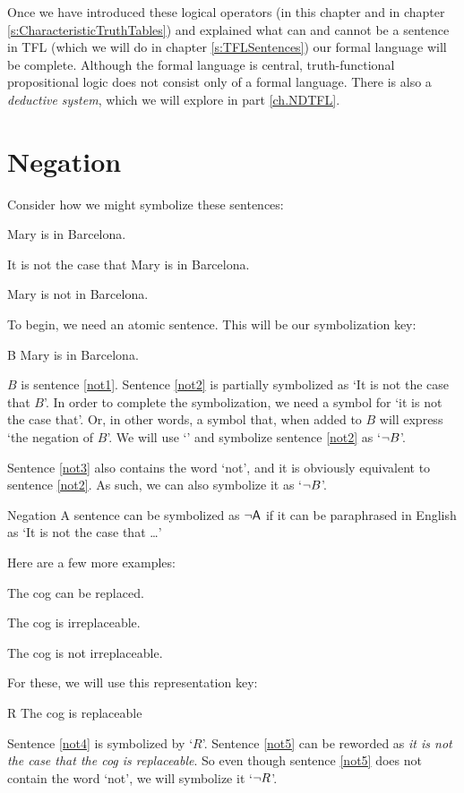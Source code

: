Once we have introduced these logical operators (in this chapter and in chapter \ref{s:CharacteristicTruthTables}) and explained what can and cannot be a sentence in TFL (which we will do in chapter \ref{s:TFLSentences}) our formal language will be complete. Although the formal language is central, truth-functional propositional logic does not consist only of a formal language. There is also a \textit{deductive system}, which we will explore in part \ref{ch.NDTFL}. 

        
\section{Negation}

Consider how we might symbolize these sentences:
	\begin{earg}
	\item[\ex{not1}] Mary is in Barcelona.
	\item[\ex{not2}] It is not the case that Mary is in Barcelona.
	\item[\ex{not3}] Mary is not in Barcelona.
	\end{earg}
To begin, we need an atomic sentence. This will be our symbolization key:
	\begin{ekey}
		\item[B] Mary is in Barcelona.
	\end{ekey}
$B$ is sentence \ref{not1}. Sentence \ref{not2} is partially symbolized as `It is not the case that $B$'. In order to complete the symbolization, we need a symbol for `it is not the case that'. Or, in other words, a symbol that, when added to $B$ will express `the negation of $B$'. We will use `\enot' and symbolize sentence \ref{not2} as `${\neg} B$'.

Sentence \ref{not3} also contains the word `not', and it is obviously equivalent to sentence \ref{not2}. As such, we can also symbolize it as `${\neg} B$'.

\begin{factboxy}{Negation}
A sentence can be symbolized as ${\neg}\mathsf{A}$ if it can be paraphrased in English as `It is not the case that \ldots'
\end{factboxy}

Here are a few more examples:
	\begin{earg}
		\item[\ex{not4}] The cog can be replaced.
		\item[\ex{not5}] The cog is irreplaceable.
		\item[\ex{not5b}] The cog is not irreplaceable.
	\end{earg}
For these, we will use this representation key:
	\begin{ekey}
		\item[R] The cog is replaceable
	\end{ekey}
Sentence \ref{not4} is symbolized by `$R$'. Sentence \ref{not5} can be reworded as \textit{it is not the case that the cog is replaceable}. So even though sentence \ref{not5} does not contain the word `not', we will symbolize it `${\neg} R$'.

